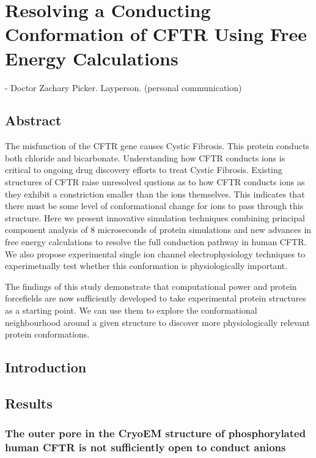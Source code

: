 \chapter{Resolving a Conducting Conformation of CFTR Using Free Energy Calculations}
\label{chap:opening}
 {- Doctor Zachary Picker. Layperson. (personal communication)}

\section*{\centering Abstract} 
The misfunction of the CFTR gene causes Cystic Fibrosis. This protein conducts both chloride and bicarbonate. Understanding how CFTR conducts ions is critical to ongoing drug discovery efforts to treat Cystic Fibrosis. Existing structures of CFTR raise unresolved qustions as to how CFTR conducts ions as they exhibit a constriction smaller than the ions themselves. This indicates that there must be some level of conformational change for ions to pass through this structure. Here we present innovative simulation techniques combining principal component analysis of 8 microseconds of protein simulations and new advances in free energy calculations to resolve the full conduction pathway in human CFTR. We also propose experimental single ion channel electrophysiology techniques to experimetnally test whether this conformation is physiologically important.  

The findings of this study demonstrate that computational power and protein forcefields are now sufficiently developed to take experimental protein structures as a starting point. We can use them to explore the conformational neighbourhood around a given structure to discover more physiologically relevant protein conformations. 


\section{Introduction}

\section{Results}

\subsection{The outer pore in the CryoEM structure of phosphorylated human CFTR is not sufficiently open to conduct anions}

